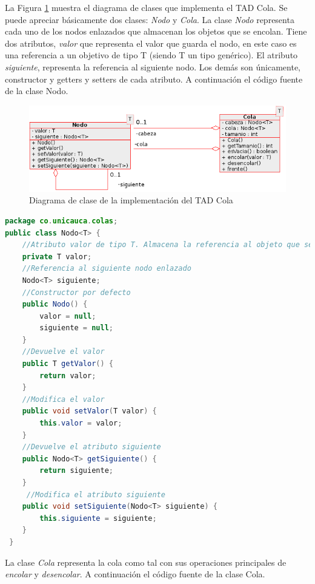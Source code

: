 La Figura \ref{fig:cola-diagrama-clases} muestra el diagrama de clases que implementa el TAD Cola. Se puede apreciar básicamente dos clases: \textit{Nodo} y \textit{Cola}. La clase \textit{Nodo} representa cada uno de los nodos enlazados que almacenan los objetos que se encolan. Tiene dos atributos,  \textsl{valor} que representa el valor que guarda el nodo, en este caso es una referencia a un objetivo de tipo T (siendo T un tipo genérico). El atributo \textsl{siguiente}, representa la referencia al siguiente nodo. Los demás son únicamente, constructor y getters y setters de cada atributo. A continuación el código fuente de la clase Nodo.


\begin{figure}
	\centering
		\includegraphics{Diagramas/DiagramaClases-Cola}
	\caption{Diagrama de clase de la implementación del TAD Cola}	
	\label{fig:cola-diagrama-clases}
\end{figure}

\begin{lstlisting}[language=Java]
package co.unicauca.colas;
public class Nodo<T> {
	//Atributo valor de tipo T. Almacena la referencia al objeto que se guarda en el nodo
 	private T valor;
 	//Referencia al siguiente nodo enlazado
 	Nodo<T> siguiente;
	//Constructor por defecto
 	public Nodo() {
 		valor = null;
 		siguiente = null;
 	}
	//Devuelve el valor 
 	public T getValor() {
 		return valor;
 	}
	//Modifica el valor
 	public void setValor(T valor) {
 		this.valor = valor;
 	}
	//Devuelve el atributo siguiente
 	public Nodo<T> getSiguiente() {
 		return siguiente;
 	}
	 //Modifica el atributo siguiente
 	public void setSiguiente(Nodo<T> siguiente) {
 		this.siguiente = siguiente;
 	}
 }
\end{lstlisting}

La clase \textit{Cola} representa la cola como tal con sus operaciones principales de \textsl{encolar} y \textsl{desencolar}. A continuación el código fuente de la clase Cola.

